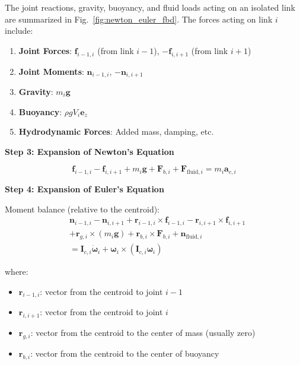 \documentclass[12pt,a4paper]{report}
\begin{document}
The joint reactions, gravity, buoyancy, and fluid loads acting on an isolated link are summarized in Fig.~\ref{fig:newton_euler_fbd}. The forces acting on link $i$ include:
\begin{enumerate}
    \item \textbf{Joint Forces}: $\mathbf{f}_{i-1,i}$ (from link $i-1$), $-\mathbf{f}_{i,i+1}$ (from link $i+1$)
    \item \textbf{Joint Moments}: $\mathbf{n}_{i-1,i}$, $-\mathbf{n}_{i,i+1}$
    \item \textbf{Gravity}: $m_i \mathbf{g}$
    \item \textbf{Buoyancy}: $\rho g V_i \mathbf{e}_z$
    \item \textbf{Hydrodynamic Forces}: Added mass, damping, etc.
\end{enumerate}

\textbf{Step 3: Expansion of Newton's Equation}

\begin{equation}
\mathbf{f}_{i-1,i} - \mathbf{f}_{i,i+1} + m_i \mathbf{g} + \mathbf{F}_{b,i} + \mathbf{F}_{\text{fluid},i} = m_i \mathbf{a}_{c,i}
\end{equation}

\textbf{Step 4: Expansion of Euler's Equation}

Moment balance (relative to the centroid):
\begin{align}
&\mathbf{n}_{i-1,i} - \mathbf{n}_{i,i+1} + \mathbf{r}_{i-1,i} \times \mathbf{f}_{i-1,i} - \mathbf{r}_{i,i+1} \times \mathbf{f}_{i,i+1} \nonumber \\
&+ \mathbf{r}_{g,i} \times (m_i \mathbf{g}) + \mathbf{r}_{b,i} \times \mathbf{F}_{b,i} + \mathbf{n}_{\text{fluid},i} \nonumber \\
&= \mathbf{I}_{c,i}\dot{\boldsymbol{\omega}}_i + \boldsymbol{\omega}_i \times (\mathbf{I}_{c,i}\boldsymbol{\omega}_i)
\end{align}

where:
\begin{itemize}
    \item $\mathbf{r}_{i-1,i}$: vector from the centroid to joint $i-1$
    \item $\mathbf{r}_{i,i+1}$: vector from the centroid to joint $i$
    \item $\mathbf{r}_{g,i}$: vector from the centroid to the center of mass (usually zero)
    \item $\mathbf{r}_{b,i}$: vector from the centroid to the center of buoyancy
\end{itemize}
\end{document}
